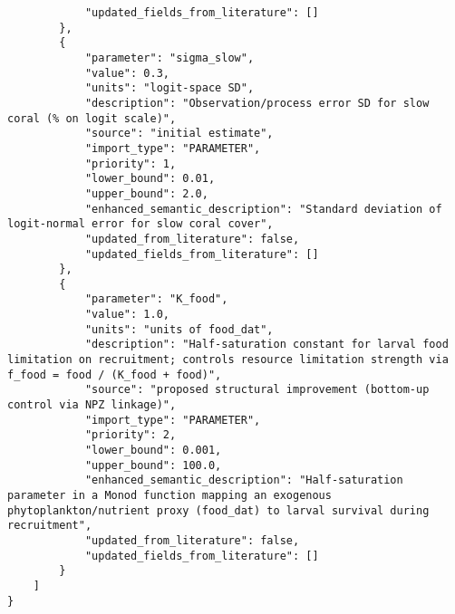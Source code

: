 \begin{lstlisting}
            "updated_fields_from_literature": []
        },
        {
            "parameter": "sigma_slow",
            "value": 0.3,
            "units": "logit-space SD",
            "description": "Observation/process error SD for slow coral (% on logit scale)",
            "source": "initial estimate",
            "import_type": "PARAMETER",
            "priority": 1,
            "lower_bound": 0.01,
            "upper_bound": 2.0,
            "enhanced_semantic_description": "Standard deviation of logit-normal error for slow coral cover",
            "updated_from_literature": false,
            "updated_fields_from_literature": []
        },
        {
            "parameter": "K_food",
            "value": 1.0,
            "units": "units of food_dat",
            "description": "Half-saturation constant for larval food limitation on recruitment; controls resource limitation strength via f_food = food / (K_food + food)",
            "source": "proposed structural improvement (bottom-up control via NPZ linkage)",
            "import_type": "PARAMETER",
            "priority": 2,
            "lower_bound": 0.001,
            "upper_bound": 100.0,
            "enhanced_semantic_description": "Half-saturation parameter in a Monod function mapping an exogenous phytoplankton/nutrient proxy (food_dat) to larval survival during recruitment",
            "updated_from_literature": false,
            "updated_fields_from_literature": []
        }
    ]
}
\end{lstlisting}
\clearpage
